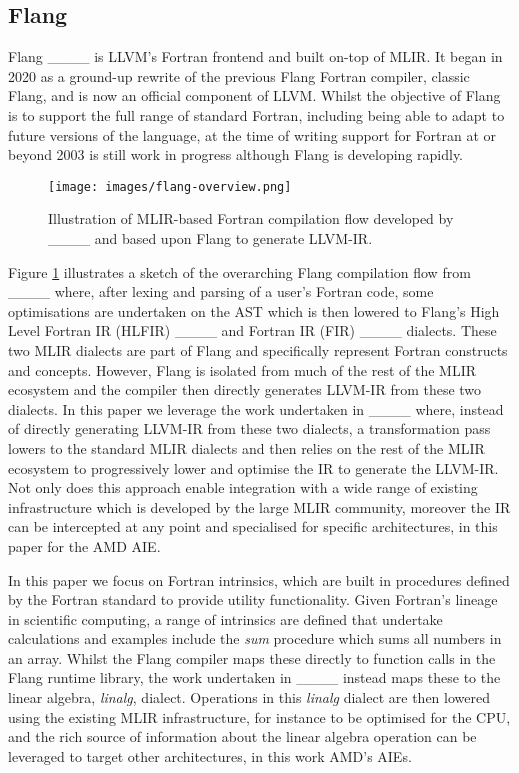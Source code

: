 \subsection{Flang}

Flang ____ is LLVM's Fortran frontend and built on-top of MLIR. It began in 2020 as a ground-up rewrite of the previous Flang Fortran compiler, classic Flang, and is now an official component of LLVM. Whilst the objective of Flang is to support the full range of standard Fortran, including being able to adapt to future versions of the language, at the time of writing support for Fortran at or beyond 2003 is still work in progress although Flang is developing rapidly.

\begin{figure}[htb]
\centering
 \texttt{[image: images/flang-overview.png]}
\caption{Illustration of MLIR-based Fortran compilation flow developed by ____ and based upon Flang to generate LLVM-IR.}	
\label{fig:flang-flow}
\end{figure}

Figure \ref{fig:flang-flow} illustrates a sketch of the overarching Flang compilation flow from ____ where, after lexing and parsing of a user's Fortran code, some optimisations are undertaken on the AST which is then lowered to Flang's High Level Fortran IR (HLFIR) ____ and Fortran IR (FIR) ____ dialects. These two MLIR dialects are part of Flang and specifically represent Fortran constructs and concepts. However, Flang is isolated from much of the rest of the MLIR ecosystem and the compiler then directly generates LLVM-IR from these two dialects. In this paper we leverage the work undertaken in ____ where, instead of directly generating LLVM-IR from these two dialects, a transformation pass lowers to the standard MLIR dialects and then relies on the rest of the MLIR ecosystem to progressively lower and optimise the IR to generate the LLVM-IR. Not only does this approach enable integration with a wide range of existing infrastructure which is developed by the large MLIR community, moreover the IR can be intercepted at any point and specialised for specific architectures, in this paper for the AMD AIE. 

In this paper we focus on Fortran intrinsics, which are built in procedures defined by the Fortran standard to provide utility functionality. Given Fortran's lineage in scientific computing, a range of intrinsics are defined that undertake calculations and examples include the \emph{sum} procedure which sums all numbers in an array. Whilst the Flang compiler maps these directly to function calls in the Flang runtime library, the work undertaken in ____ instead maps these to the linear algebra, \emph{linalg}, dialect. Operations in this \emph{linalg} dialect are then lowered using the existing MLIR infrastructure, for instance to be optimised for the CPU, and the rich source of information about the linear algebra operation can be leveraged to target other architectures, in this work AMD's AIEs.